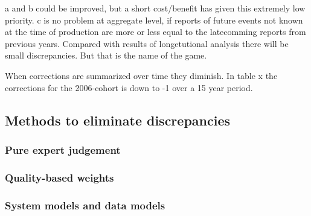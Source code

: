 \documentclass[USenglish]{article}
\begin{document}
a and b could be improved, but a short cost/benefit has given this extremely low priority. c is no problem at aggregate level, if reports of future events not known at the time of production are more or less equal to the latecomming reports from previous years. Compared with results of longetutional analysis there will be small discrepancies. But that is the name of the game.

When corrections are summarized over time they diminish. In table x the corrections for the 2006-cohort is down to -1 over a 15 year period. 

\subsection{Methods to eliminate discrepancies}

\subsubsection{Pure expert judgement}

\citep{lomax2013subnational}


\subsubsection{Quality-based weights}




\subsubsection{System models and data models}

\citep{bryant2013bayesian} \citep{wheldon2013reconstructing}\citep{wheldon2015bayesian}
\end{document}
